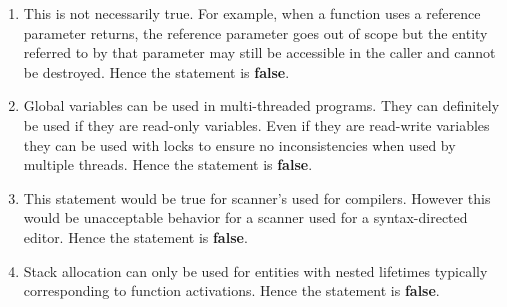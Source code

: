 \documentclass[12pt]{article}
\begin{document}
\begin{enumerate}
\begin{enumerate}
\item This is not necessarily true. For example, when a function
  uses a reference parameter returns, the reference parameter
  goes out of scope but the entity referred to by that parameter
  may still be accessible in the caller and cannot be destroyed.
  Hence the statement is \textbf{false}.

\item Global variables can be used in multi-threaded programs.  They
  can definitely be used if they are read-only variables.  Even if
  they are read-write variables they can be used with locks to ensure
  no inconsistencies when used by multiple threads.  Hence the
  statement is \textbf{false}.


\item This statement would be true for scanner's used for compilers.
  However this would be unacceptable behavior for a scanner used for a
  syntax-directed editor.  Hence the statement is \textbf{false}.


\item Stack allocation can only be used for entities with nested
  lifetimes typically corresponding to function activations.  Hence
  the statement is \textbf{false}.

\end{enumerate}

\end{enumerate}
\end{document}
